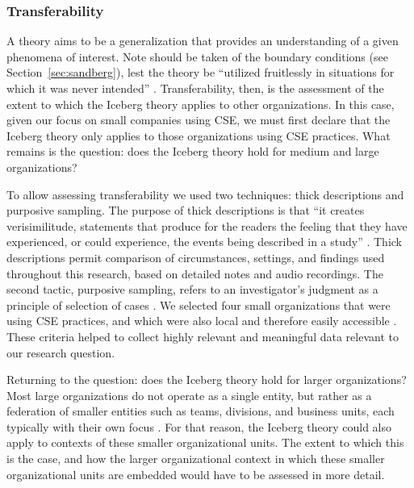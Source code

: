 \documentclass[smallextended]{svjour3}
\begin{document}
\subsubsection{Transferability}
A theory aims to be a generalization that provides an understanding of a given phenomena of interest. Note should be taken of the boundary conditions (see Section~\ref{sec:sandberg}), lest the theory be ``utilized fruitlessly in situations for which it was never intended'' \cite[p. 8]{miner1980}.
Transferability, then, is the assessment of the extent to which the Iceberg theory applies to other organizations. In this case, given our focus on small companies using CSE, we must first declare that the Iceberg theory only applies to those organizations using CSE practices. What remains is the question: does the Iceberg theory hold for medium and large organizations? 

To allow assessing transferability we used two techniques: thick descriptions \citep{geertz2008thick} and purposive sampling.
The purpose of thick descriptions is that ``it creates verisimilitude, statements that produce for the readers the feeling that they have experienced, or could experience, the events being described in a study'' \citep{creswell2000determining}. 
Thick descriptions permit comparison of circumstances, settings, and findings used throughout this research, based on detailed notes and audio recordings. 
The second tactic, purposive sampling, refers to an investigator's judgment as a principle of selection of cases \citep{robson2002}. We selected four small organizations that were using CSE practices, and which were also local and therefore easily accessible \citep{miles1994qualitative}. These criteria helped to collect highly relevant and meaningful data relevant to our research question.

Returning to the question: does the Iceberg theory hold for larger organizations? Most large organizations do not operate as a single entity, but rather as a federation of smaller entities such as teams, divisions, and business units, each typically with their own focus \citep{stol2011comparative}. For that reason, the Iceberg theory could also apply to contexts of these smaller organizational units. The extent to which this is the case, and how the larger organizational context in which these smaller organizational units are embedded would have to be assessed in more detail.
\end{document}
